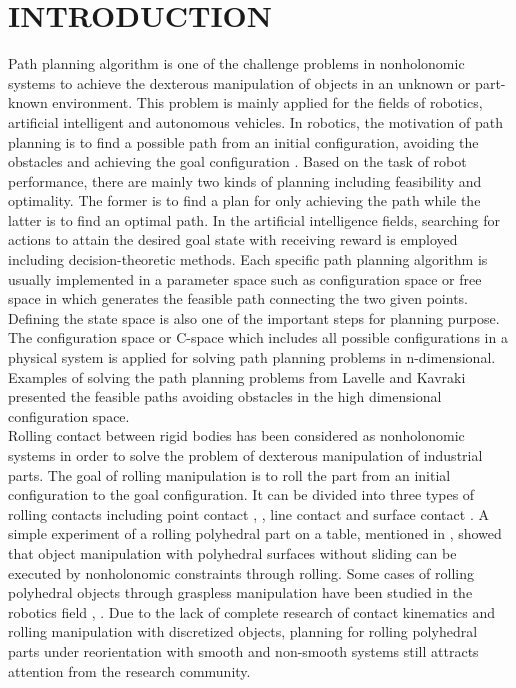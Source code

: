 
\section{INTRODUCTION}
\noindent Path planning algorithm is one of the challenge problems in nonholonomic systems to achieve the dexterous manipulation of objects in an unknown or part-known environment. This problem is mainly applied for the fields of robotics, artificial intelligent and autonomous vehicles. In robotics, the motivation of path planning is to find a possible path from an initial configuration, avoiding the obstacles and achieving the goal configuration \cite{Zhang2018_PP_mobileRobot}. Based on the task of robot performance, there are mainly two kinds of planning including feasibility and optimality. The former is to find a plan for only achieving the path while the latter is to find an optimal path. In the artificial intelligence fields, searching for actions to attain the desired goal state with receiving reward is employed including decision-theoretic methods. Each specific path planning algorithm is usually implemented in a parameter space such as configuration space or free space in which generates the feasible path connecting the two given points. Defining the state space is also one of the important steps for planning purpose. The configuration space or C-space which includes all possible configurations in a physical system is applied for solving path planning problems in n-dimensional. Examples of solving the path planning problems from Lavelle \cite{LaValle06_PlanningAlgorithm} and Kavraki \cite{Kavraki96_PRM_HighDimensionSPace} presented the feasible paths avoiding obstacles in the high dimensional configuration space. \\

\noindent Rolling contact between rigid bodies has been considered as nonholonomic systems in order to solve the problem of dexterous manipulation of industrial parts. The goal of rolling manipulation is to roll the part from an initial configuration to the goal configuration. It can be divided into three types of rolling contacts including point contact \cite{Cai86_PlanarMotion_PointContact}, \cite{Cai87_SpatialMotion_PointContact}, line contact \cite{Cai88_SpatialMotion_LineContact} and surface contact \cite{Borisov08_ChaplypinBall_FixSphere}. A simple experiment of a rolling polyhedral part on a table, mentioned in \cite{Bicchi2004_Reachability_steering_Polyhedra}, showed that object manipulation with polyhedral surfaces without sliding can be executed by nonholonomic constraints through rolling. Some cases of rolling polyhedral objects through graspless manipulation have been studied in the robotics field \cite{Aiyama93_Pivoting}, \cite{Erdmann91_polyhedronRolling_on_table}. Due to the lack of complete research of contact kinematics and rolling manipulation with discretized objects, planning for rolling polyhedral parts under reorientation with smooth and non-smooth systems still attracts attention from the research community.\\

